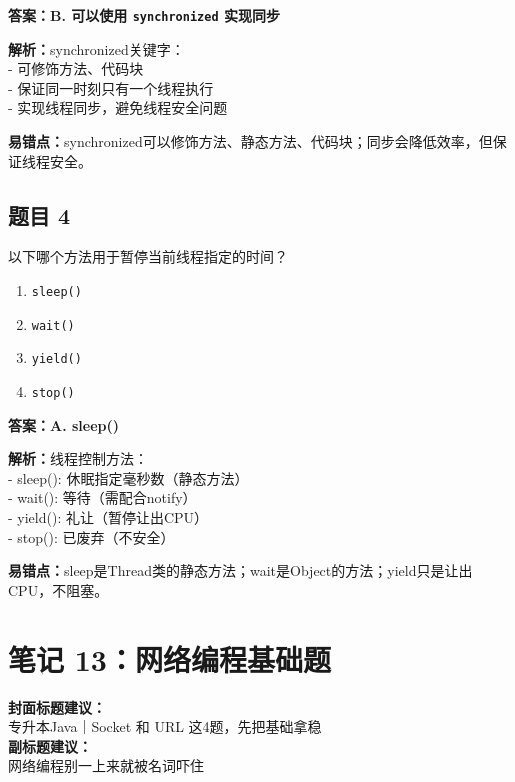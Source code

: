 \documentclass[12pt,a4paper]{ctexart}
\begin{document}
\begin{answerbox}
	\textbf{答案：B. 可以使用 \texttt{synchronized} 实现同步}

	\textbf{解析：}synchronized关键字：\\
	- 可修饰方法、代码块\\
	- 保证同一时刻只有一个线程执行\\
	- 实现线程同步，避免线程安全问题

	\textbf{易错点：}synchronized可以修饰方法、静态方法、代码块；同步会降低效率，但保证线程安全。
\end{answerbox}

\subsection*{题目 4}
以下哪个方法用于暂停当前线程指定的时间？
\begin{enumerate}[label=\Alph*.]
	\item \texttt{sleep()}
	\item \texttt{wait()}
	\item \texttt{yield()}
	\item \texttt{stop()}
\end{enumerate}

\begin{answerbox}
	\textbf{答案：A. sleep()}

	\textbf{解析：}线程控制方法：\\
	- sleep(): 休眠指定毫秒数（静态方法）\\
	- wait(): 等待（需配合notify）\\
	- yield(): 礼让（暂停让出CPU）\\
	- stop(): 已废弃（不安全）

	\textbf{易错点：}sleep是Thread类的静态方法；wait是Object的方法；yield只是让出CPU，不阻塞。
\end{answerbox}

\newpage

\section{笔记 13：网络编程基础题}
\begin{coverbox}
	\textbf{封面标题建议：}\\
	专升本Java｜Socket 和 URL 这4题，先把基础拿稳\\
	\textbf{副标题建议：}\\
	网络编程别一上来就被名词吓住
\end{coverbox}
\end{document}
